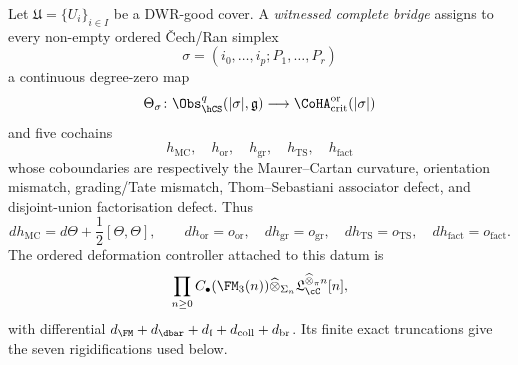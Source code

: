 \begin{construction}
\label{constr:cy3-simplexwise-complete-bridge}
Let $\mathfrak U=\{U_i\}_{i\in I}$ be a DWR-good cover. A
\emph{witnessed complete bridge} assigns to every non-empty ordered
\v{C}ech/Ran simplex
\[
 \sigma=(i_0,\ldots,i_p;P_1,\ldots,P_r)
\]
a continuous degree-zero map
\[
 \Theta_\sigma\colon
 \Obs_{\hCS}^{q}(|\sigma|,\mathfrak g)
 \longrightarrow
 \CoHA_{\mathrm{crit}}^{\mathrm{or}}(|\sigma|)
\]
and five cochains
\[
 h_{\mathrm{MC}},\quad h_{\mathrm{or}},\quad h_{\mathrm{gr}},\quad
 h_{\mathrm{TS}},\quad h_{\mathrm{fact}}
\]
whose coboundaries are respectively the Maurer--Cartan curvature,
orientation mismatch, grading/Tate mismatch, Thom--Sebastiani associator
defect, and disjoint-union factorisation defect. Thus
\[
 dh_{\mathrm{MC}}=
 d\Theta+\frac12[\Theta,\Theta],
 \qquad
 dh_{\mathrm{or}}=o_{\mathrm{or}},\quad
 dh_{\mathrm{gr}}=o_{\mathrm{gr}},\quad
 dh_{\mathrm{TS}}=o_{\mathrm{TS}},\quad
 dh_{\mathrm{fact}}=o_{\mathrm{fact}}.
\]
The ordered deformation controller attached to this datum is
\[
 \prod_{n\geq0} C_\bullet(\FM_3(n))
 \widehat\otimes_{\Sigma_n}
 \mathfrak L_{\cC}^{\widehat\otimes_\pi n}[n],
\]
with differential $d_{\FM}+d_{\dbar}+d_{\mathfrak l}
+d_{\mathrm{coll}}+d_{\mathrm{br}}$. Its finite exact truncations give
the seven rigidifications used below.
\end{construction}

